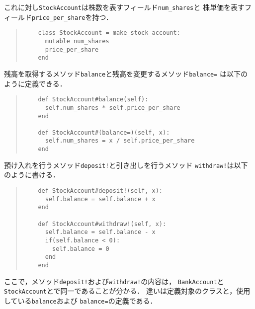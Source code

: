\documentclass[a4paper,11pt,dvipdfmx]{jreport}
\begin{document}
これに対し\verb|StockAccount|は株数を表すフィールド\verb|num_shares|と
株単価を表すフィールド\verb|price_per_share|を持つ．
\begin{quote}
	\begin{verbatim}
	class StockAccount = make_stock_account:
	  mutable num_shares
	  price_per_share
	end
	\end{verbatim}
\end{quote}
残高を取得するメソッド\verb|balance|と残高を変更するメソッド\verb|balance=|
は以下のように定義できる．
\begin{quote}
	\begin{verbatim}
	def StockAccount#balance(self):
	  self.num_shares * self.price_per_share
	end
	
	def StockAccount#(balance=)(self, x):
	  self.num_shares = x / self.price_per_share
	end
	\end{verbatim}
\end{quote}
預け入れを行うメソッド\verb|deposit!|と引き出しを行うメソッド
\verb|withdraw!|は以下のように書ける．
\begin{quote}
	\begin{verbatim}
	def StockAccount#deposit!(self, x):
	  self.balance = self.balance + x
	end
	
	def StockAccount#withdraw!(self, x):
	  self.balance = self.balance - x
	  if(self.balance < 0):
	    self.balance = 0
	  end
	end
	\end{verbatim}
\end{quote}

ここで，メソッド\verb|deposit!|および\verb|withdraw!|の内容は，
\verb|BankAccount|と\verb|StockAccount|とで同一であることが分かる．
違いは定義対象のクラスと，使用している\verb|balance|および
\verb|balance=|の定義である．
\end{document}
